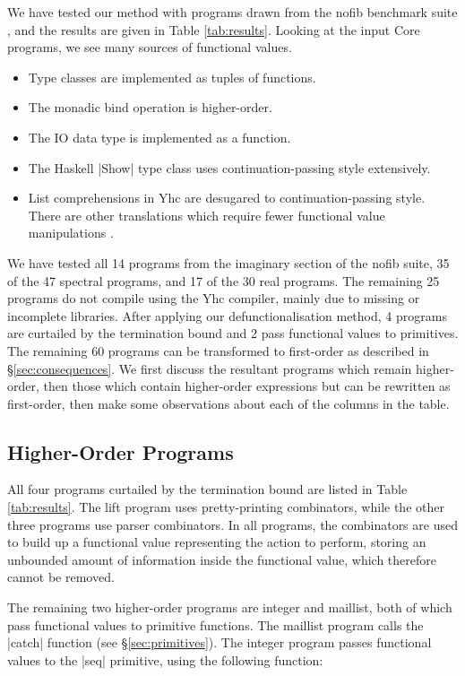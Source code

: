 \documentclass[preprint]{sigplanconf}
\begin{document}
We have tested our method with programs drawn from the nofib benchmark suite \cite{nofib}, and the results are given in Table \ref{tab:results}. Looking at the input Core programs, we see many sources of functional values.

\begin{itemize}
\item Type classes are implemented as tuples of functions.
\item The monadic bind operation is higher-order.
\item The IO data type is implemented as a function.
\item The Haskell |Show| type class uses continuation-passing style extensively.
\item List comprehensions in Yhc are desugared to continuation-passing style. There are other translations which require fewer functional value manipulations \cite{coutts:stream_fusion}.
\end{itemize}

We have tested all 14 programs from the imaginary section of the nofib suite, 35 of the 47 spectral programs, and 17 of the 30 real programs. The remaining 25 programs do not compile using the Yhc compiler, mainly due to missing or incomplete libraries. After applying our defunctionalisation method, 4 programs are curtailed by the termination bound and 2 pass functional values to primitives. The remaining 60 programs can be transformed to first-order as described in \S\ref{sec:consequences}. We first discuss the resultant programs which remain higher-order, then those which contain higher-order expressions but can be rewritten as first-order, then make some observations about each of the columns in the table.

\subsection{Higher-Order Programs}

All four programs curtailed by the termination bound are listed in Table \ref{tab:results}. The lift program uses pretty-printing combinators, while the other three programs use parser combinators. In all programs, the combinators are used to build up a functional value representing the action to perform, storing an unbounded amount of information inside the functional value, which therefore cannot be removed.

The remaining two higher-order programs are integer and maillist, both of which pass functional values to primitive functions. The maillist program calls the |catch| function (see \S\ref{sec:primitives}). The integer program passes functional values to the |seq| primitive, using the following function:
\end{document}
